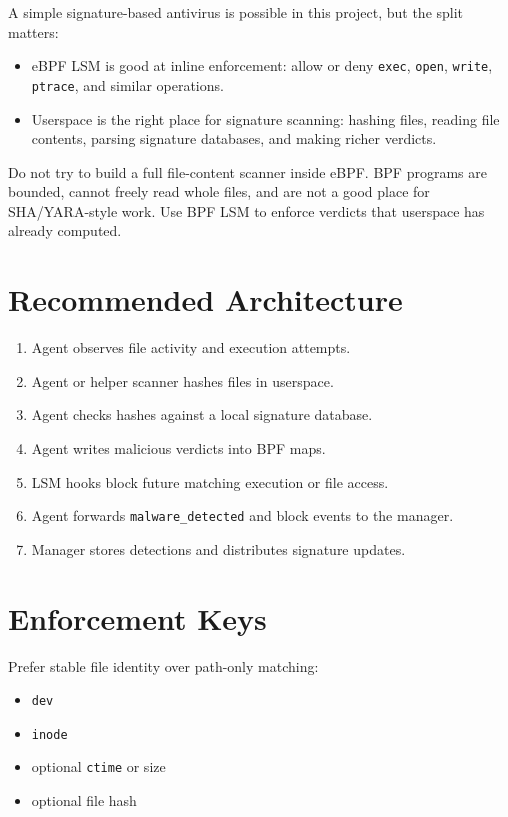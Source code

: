 \documentclass[
  12pt,
]{report}
\providecommand{\tightlist}{%
  \setlength{\itemsep}{0pt}\setlength{\parskip}{0pt}}
\begin{document}
A simple signature-based antivirus is possible in this project, but the
split matters:

\begin{itemize}
\tightlist
\item
  eBPF LSM is good at inline enforcement: allow or deny \texttt{exec},
  \texttt{open}, \texttt{write}, \texttt{ptrace}, and similar
  operations.
\item
  Userspace is the right place for signature scanning: hashing files,
  reading file contents, parsing signature databases, and making richer
  verdicts.
\end{itemize}

Do not try to build a full file-content scanner inside eBPF. BPF
programs are bounded, cannot freely read whole files, and are not a good
place for SHA/YARA-style work. Use BPF LSM to enforce verdicts that
userspace has already computed.

\section{Recommended Architecture}\label{recommended-architecture}

\begin{enumerate}
\def\labelenumi{\arabic{enumi}.}
\tightlist
\item
  Agent observes file activity and execution attempts.
\item
  Agent or helper scanner hashes files in userspace.
\item
  Agent checks hashes against a local signature database.
\item
  Agent writes malicious verdicts into BPF maps.
\item
  LSM hooks block future matching execution or file access.
\item
  Agent forwards \texttt{malware\_detected} and block events to the
  manager.
\item
  Manager stores detections and distributes signature updates.
\end{enumerate}

\section{Enforcement Keys}\label{enforcement-keys}

Prefer stable file identity over path-only matching:

\begin{itemize}
\tightlist
\item
  \texttt{dev}
\item
  \texttt{inode}
\item
  optional \texttt{ctime} or size
\item
  optional file hash
\end{itemize}
\end{document}
